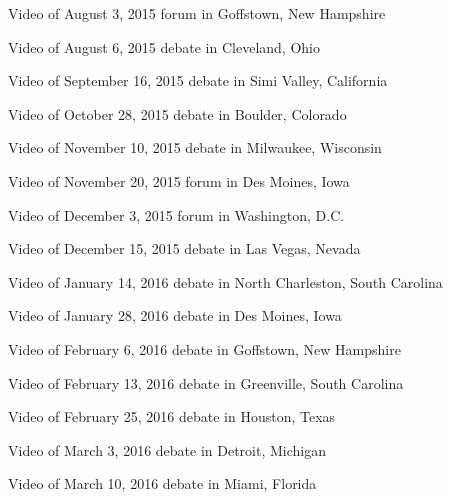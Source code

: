 Video of August 3, 2015 forum in Goffstown, New Hampshire

Video of August 6, 2015 debate in Cleveland, Ohio

Video of September 16, 2015 debate in Simi Valley, California

Video of October 28, 2015 debate in Boulder, Colorado

Video of November 10, 2015 debate in Milwaukee, Wisconsin

Video of November 20, 2015 forum in Des Moines, Iowa

Video of December 3, 2015 forum in Washington, D.C.

Video of December 15, 2015 debate in Las Vegas, Nevada

Video of January 14, 2016 debate in North Charleston, South Carolina

Video of January 28, 2016 debate in Des Moines, Iowa

Video of February 6, 2016 debate in Goffstown, New Hampshire

Video of February 13, 2016 debate in Greenville, South Carolina

Video of February 25, 2016 debate in Houston, Texas

Video of March 3, 2016 debate in Detroit, Michigan

Video of March 10, 2016 debate in Miami, Florida
